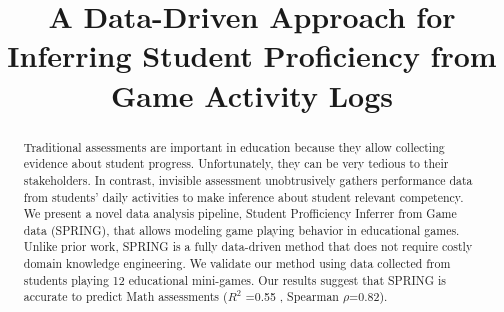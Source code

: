 \documentclass{sigchi}
\def\algname{SPRING\xspace}
\def\plaintitle{A Data-Driven Approach for Inferring Student Proficiency from Game Activity Logs  }
\begin{document}
\title{\plaintitle}

\author
{%
}

  
\maketitle

\begin{abstract}
Traditional assessments are important in education because they allow collecting evidence about student progress. 
Unfortunately, they can be very tedious to their stakeholders.
In contrast, invisible assessment  unobtrusively gathers  performance data from students' daily activities to make inference about student relevant competency.
We present a novel data analysis pipeline, {Student Profficiency Inferrer from Game data} (\algname), that allows modeling  game playing behavior in educational games.
Unlike prior work, \algname is a fully data-driven method that does not require costly domain knowledge engineering.
We validate our method using data collected from students playing 12 educational mini-games.
Our results suggest that  \algname is accurate to predict Math assessments ($R^2$ =0.55 , Spearman $\rho$=0.82).
\end{abstract}

{}
\end{document}
